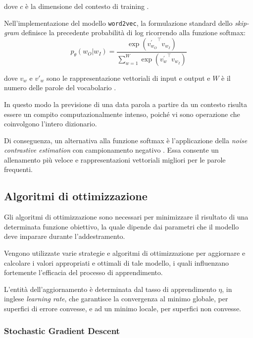 dove $c$ è la dimensione del contesto di training \cite{mikolov2013distributed}. 

Nell'implementazione del modello \texttt{word2vec}, la formulazione standard dello \emph{skip-gram} definisce la precedente probabilità di log ricorrendo alla funzione softmax:
\begin{equation}
p_{\theta}(w_{O} | w_{I}) = \frac{\exp({v^{\prime}_{w_{O}}}^{\top} v_{w_{I}})}{\sum_{w=1}^{W} \exp({v^{\prime}_{w}}^{\top} v_{w_I})}
\end{equation}

dove $v_w$ e $v'_w$ sono le rappresentazione vettoriali di input e output e $W$ è il numero delle parole del vocabolario \cite{dyer2014notes}.

In questo modo la previsione di una data parola a partire da un contesto risulta essere un compito computazionalmente intenso, poiché vi sono operazione che coinvolgono l'intero dizionario.

Di conseguenza, un alternativa alla funzione softmax è l'applicazione della \emph{noise contrastive estimation} con campionamento negativo \cite{liu2016classification, viswesvaran2000measurement}. Essa consente un allenamento più veloce e rappresentazioni vettoriali migliori per le parole frequenti.

\subsection{Algoritmi di ottimizzazione}
\label{subsec:optimizer}

Gli algoritmi di ottimizzazione sono necessari per minimizzare il risultato di una determinata funzione obiettivo, la quale dipende dai parametri che il modello deve imparare durante l'addestramento. 

Vengono utilizzate varie strategie e algoritmi di ottimizzazione per aggiornare e calcolare i valori appropriati e ottimali di tale modello, i quali influenzano fortemente l'efficacia del processo di apprendimento.

L'entità dell'aggiornamento è determinata dal tasso di apprendimento $\eta$, in inglese \emph{learning rate}, che garantisce la convergenza al minimo globale, per superfici di errore convesse, e ad un minimo locale, per superfici non convesse. 

\subsubsection{Stochastic Gradient Descent}
\label{subsubsec:SGD}

